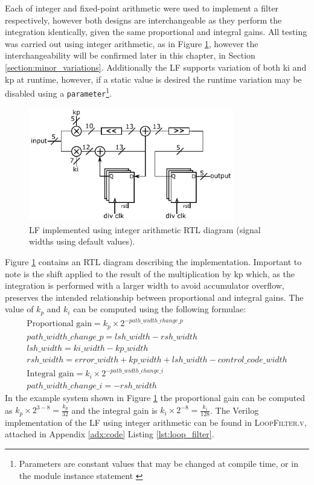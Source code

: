 Each of integer and fixed-point arithmetic were used to implement a filter respectively, however both designs are interchangeable as they perform the integration identically, given the same proportional and integral gains. All testing was carried out using integer arithmetic, as in Figure \ref{fig:integer_lf}, however the interchangeability will be confirmed later in this chapter, in Section \ref{section:minor_variations}. Additionally the \ac{LF} supports variation of both \acs{ki} and \acs{kp} at runtime, however, if a static value is desired the runtime variation may be disabled using a \texttt{parameter}\footnote{Parameters are constant values that may be changed at compile time, or in the module instance statement \cite{hdlworks2}}.
\begin{figure}[h]%
    \centering
    \includegraphics[width=0.8\textwidth]{../integer_lf} 
    \caption[\acl{LF} implemented using integer arithmetic \ac{RTL} diagram]{\acl{LF} implemented using integer arithmetic \ac{RTL} diagram (signal widths using default values).}
    \label{fig:integer_lf}
\end{figure}

Figure \ref{fig:integer_lf} contains an \ac{RTL} diagram describing the implementation. Important to note is the shift applied to the result of the multiplication by \acs{kp} which, as the integration is performed with a larger width to avoid accumulator overflow, preserves the intended relationship between proportional and integral gains. The value of $k_p$ and $k_i$ can be computed using the following formulae:
\begin{gather}
\text{Proportional gain} = k_p\times 2^{-path\_width\_change\_p} \\
path\_width\_change\_p = lsh\_width - rsh\_width \\
lsh\_width = ki\_width - kp\_width  \\
rsh\_width = error\_width + kp\_width + lsh\_width - control\_code\_width \\
\text{Integral gain} = k_i\times 2^{-path\_width\_change\_i} \\
path\_width\_change\_i = - rsh\_width
\end{gather}
In the example system shown in Figure \ref{fig:integer_lf} the proportional gain can be computed as $k_p\times 2^{3-8} = \frac{k_p}{32}$ and the integral gain is $k_i\times 2^{-8} = \frac{k_i}{128}$.
The Verilog implementation of the \ac{LF} using integer arithmetic can be found in \textsc{LoopFilter.v}, attached in Appendix \ref{adx:code} Listing \ref{lst:loop_filter}.

